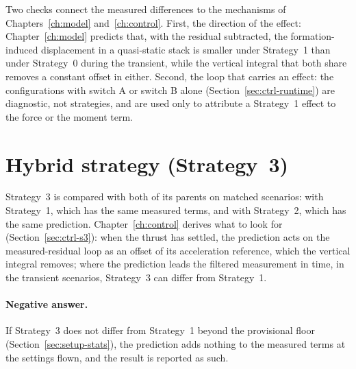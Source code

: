 Two checks connect the measured differences to the mechanisms of Chapters~\ref{ch:model}
and~\ref{ch:control}. First, the direction of the effect: Chapter~\ref{ch:model} predicts that, with
the residual subtracted, the formation-induced displacement in a quasi-static stack is smaller under
Strategy~1 than under Strategy~0 during the transient, while the vertical integral that both share
removes a constant offset in either. Second, the loop that carries an effect: the configurations
with switch A or switch B alone (Section~\ref{sec:ctrl-runtime}) are diagnostic, not strategies,
and are used only to attribute a Strategy~1 effect to the force or the moment term.


\section{Hybrid strategy (Strategy~3)}
\label{sec:res2-hybrid}

Strategy~3 is compared with both of its parents on matched scenarios: with Strategy~1, which has the
same measured terms, and with Strategy~2, which has the same prediction. Chapter~\ref{ch:control}
derives what to look for (Section~\ref{sec:ctrl-s3}): when the thrust has settled, the prediction
acts on the measured-residual loop as an offset of its acceleration reference, which the vertical
integral removes; where the prediction leads the filtered measurement in time, in the transient
scenarios, Strategy~3 can differ from Strategy~1.


\paragraph{Negative answer.} If Strategy~3 does not differ from Strategy~1 beyond the provisional
floor (Section~\ref{sec:setup-stats}), the prediction adds nothing to the measured terms at the
settings flown, and the result is reported as such.


